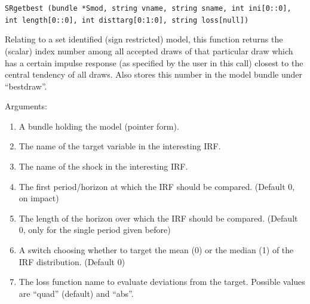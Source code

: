 \documentclass[a4paper,10pt]{article}
\newenvironment{funcdoc}[1]
{\noindent\hrulefill\newline\nopagebreak\texttt{#1}%
\nopagebreak\par\noindent\hrulefill%
\nopagebreak\par\nopagebreak\smallskip\nopagebreak\par}
{\bigskip}
\begin{document}
\begin{funcdoc}{SRgetbest (bundle *Smod, string vname, string sname,
    int ini[0::0], \\ int length[0::0],  int disttarg[0:1:0],  string loss[null]) }
  \noindent Relating to a set identified (sign restricted) model, this function returns
   the (scalar) index number among all accepted draws of that particular draw which has 
   a certain impulse response (as specified by the user in this call) closest to the central 
   tendency of all draws. Also stores this number in the model bundle under ``bestdraw''. 
   
  \noindent Arguments:
  \begin{enumerate}
  \item A bundle holding the model (pointer form).
  \item The name of the target variable in the interesting IRF.
  \item The name of the shock in the interesting IRF.
  \item The first period/horizon at which the IRF should be compared. (Default 0, on impact)
  \item The length of the horizon over which the IRF should be compared. (Default 0, only
  for the single period given before)
  \item A switch choosing whether to target the mean (0) or the median (1) of the IRF 
  distribution. (Default 0)
  \item The loss function name to evaluate deviations from the target. Possible values are
  ``quad'' (default) and ``abs''.
   \end{enumerate}  
\end{funcdoc}
\end{document}
